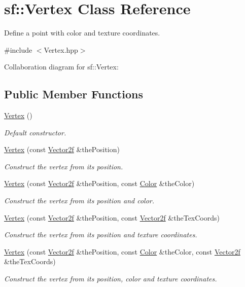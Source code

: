 \hypertarget{classsf_1_1_vertex}{}\section{sf\+:\+:Vertex Class Reference}
\label{classsf_1_1_vertex}


Define a point with color and texture coordinates.  




{\ttfamily \#include $<$Vertex.\+hpp$>$}



Collaboration diagram for sf\+:\+:Vertex\+:
\subsection*{Public Member Functions}
\begin{DoxyCompactItemize}
\item 
\mbox{\label{classsf_1_1_vertex_a6b4c79cd69f7ec1296fede536f39e9c8}} 
\hyperlink{classsf_1_1_vertex_a6b4c79cd69f7ec1296fede536f39e9c8}{Vertex} ()
\begin{DoxyCompactList}\small\item\em Default constructor. \end{DoxyCompactList}\item 
\hyperlink{classsf_1_1_vertex_a4dccc5c351b73b6fac169fe442535b40}{Vertex} (const \hyperlink{classsf_1_1_vector2}{Vector2f} \&the\+Position)
\begin{DoxyCompactList}\small\item\em Construct the vertex from its position. \end{DoxyCompactList}\item 
\hyperlink{classsf_1_1_vertex_a70b0679b4ec531d5bd1a7d0225c7321a}{Vertex} (const \hyperlink{classsf_1_1_vector2}{Vector2f} \&the\+Position, const \hyperlink{classsf_1_1_color}{Color} \&the\+Color)
\begin{DoxyCompactList}\small\item\em Construct the vertex from its position and color. \end{DoxyCompactList}\item 
\hyperlink{classsf_1_1_vertex_ab9bf849c4c0d82d09bf5bece23d2456a}{Vertex} (const \hyperlink{classsf_1_1_vector2}{Vector2f} \&the\+Position, const \hyperlink{classsf_1_1_vector2}{Vector2f} \&the\+Tex\+Coords)
\begin{DoxyCompactList}\small\item\em Construct the vertex from its position and texture coordinates. \end{DoxyCompactList}\item 
\hyperlink{classsf_1_1_vertex_ad5943f2b3cbc64b6e714bb37ccaf4960}{Vertex} (const \hyperlink{classsf_1_1_vector2}{Vector2f} \&the\+Position, const \hyperlink{classsf_1_1_color}{Color} \&the\+Color, const \hyperlink{classsf_1_1_vector2}{Vector2f} \&the\+Tex\+Coords)
\begin{DoxyCompactList}\small\item\em Construct the vertex from its position, color and texture coordinates. \end{DoxyCompactList}\end{DoxyCompactItemize}
